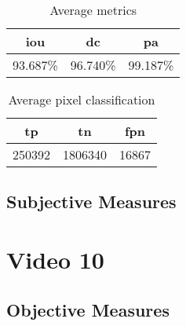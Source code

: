 \begin{minipage}[c]{0.475\textwidth}
\begin{table}[H]
    \centering
    \begin{tabular}{||c c c||} 
        \hline
        \acrshort{iou} & \acrshort{dc} & \acrshort{pa} \\ [0.5ex] 
        \hline\hline
        93.687\% & 96.740\% & 99.187\% \\ [1ex] 
        \hline
    \end{tabular}
    \caption{Average metrics}
    \label{tab:metrics_video_9}
\end{table}
\end{minipage}
\begin{minipage}[c]{0.475\textwidth}
\begin{table}[H]
    \centering
    \begin{tabular}{||c c c||} 
        \hline
        \acrshort{tp} & \acrshort{tn} & \acrshort{fpn} \\ [0.5ex] 
        \hline\hline
        250392 & 1806340 & 16867 \\ [1ex] 
        \hline
    \end{tabular}
    \caption{Average pixel classification}
    \label{tab:pixels_video_9}
\end{table}
\end{minipage}

\subsection{Subjective Measures}



\section{Video 10}
\subsection{Objective Measures}


